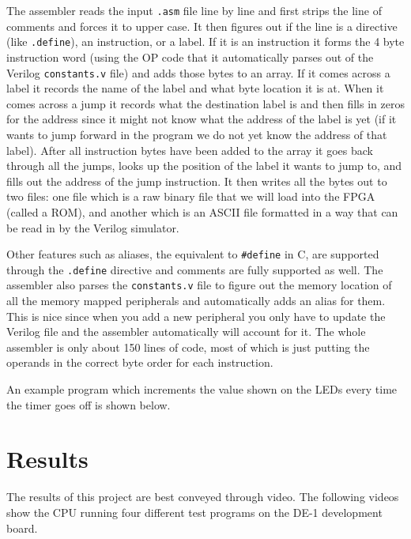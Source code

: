 \documentclass[10pt]{article}
\begin{document}
    The assembler reads the input \texttt{.asm} file line by line and first
    strips the line of comments and forces it to upper case. It then figures
    out if the line is a directive (like \texttt{.define}), an instruction, or
    a label. If it is an instruction it forms the 4 byte instruction word
    (using the OP code that it automatically parses out of the Verilog
    \texttt{constants.v} file) and adds those bytes to an array. If it comes
    across a label it records the name of the label and what byte location it
    is at. When it comes across a jump it records what the destination label is
    and then fills in zeros for the address since it might not know what the
    address of the label is yet (if it wants to jump forward in the program we
    do not yet know the address of that label).  After all instruction bytes
    have been added to the array it goes back through all the jumps, looks up
    the position of the label it wants to jump to, and fills out the address of
    the jump instruction. It then writes all the bytes out to two files: one
    file which is a raw binary file that we will load into the FPGA (called a
    ROM), and another which is an ASCII file formatted in a way that can be
    read in by the Verilog simulator.

    Other features such as aliases, the equivalent to \texttt{\#define} in C,
    are supported through the \texttt{.define} directive and comments are fully
    supported as well. The assembler also parses the \texttt{constants.v} file
    to figure out the memory location of all the memory mapped peripherals and
    automatically adds an alias for them. This is nice since when you add a new
    peripheral you only have to update the Verilog file and the assembler
    automatically will account for it. The whole assembler is only about 150
    lines of code, most of which is just putting the operands in the correct
    byte order for each instruction.

    An example program which increments the value shown on the  LEDs every time
    the timer goes off is shown below.

    


\newpage
\section{Results}

    The results of this project are best conveyed through video. The following
    videos show the CPU running four different test programs on the DE-1
    development board.
\end{document}
